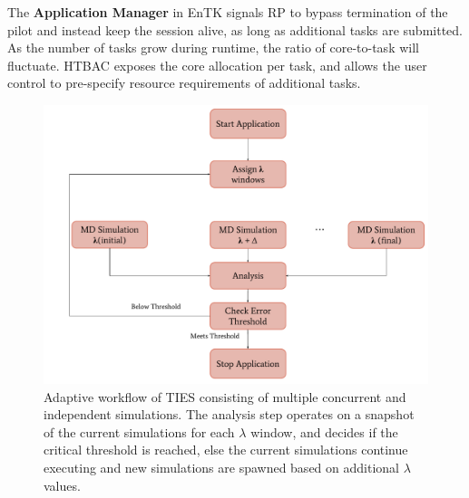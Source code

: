 The \textbf{Application
Manager} in EnTK signals RP to bypass termination of the pilot and instead
keep the session alive, as long as additional tasks are submitted. As the
number of tasks grow during runtime, the ratio of core-to-task will fluctuate.
HTBAC exposes the core allocation per task, and allows the user control to
pre-specify resource requirements of additional tasks.

\begin{figure}
  \centering
   \includegraphics[width=\columnwidth]{figures/adaptive_TIES_workflow_diagram.pdf}
  \caption{Adaptive workflow of TIES consisting of multiple concurrent and 
  independent simulations. The analysis step operates on a snapshot of the 
  current simulations for each $\lambda$ window, and decides if the critical 
  threshold is reached, else the current simulations continue executing and new 
  simulations are spawned based on additional $\lambda$ values.}
\label{fig:adaptive_ties}
\end{figure}





